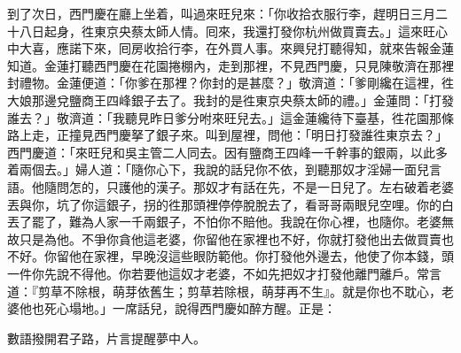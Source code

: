 到了次日，西門慶在廳上坐着，叫過來旺兒來：「你收拾衣服行李，趕明日三月二十八日起身，徃東京央蔡太師人情。囘來，我還打發你杭州做買賣去。」這來旺心中大喜，{}應諾下來，囘房收拾行李，在外買人事。來興兒打聽得知，就來告報金蓮知道。金蓮打聽西門慶在花園捲棚內，走到那裡，不見西門慶，只見陳敬濟在那裡封禮物。金蓮便道：「你爹在那裡？你封的是甚麼？」敬濟道：「爹剛纔在這裡，徃大娘那邊兌鹽商王四峰銀子去了。我封的是徃東京央蔡太師的禮。」金蓮問：「打發誰去？」敬濟道：「我聽見昨日爹分咐來旺兒去。」這金蓮纔待下臺基，徃花園那條路上走，正撞見西門慶拏了銀子來。叫到屋裡，問他：「明日打發誰徃東京去？」西門慶道：「來旺兒和吳主管二人同去。因有鹽商王四峰一千幹事的銀兩，以此多着兩個去。」婦人道：「隨你心下，我說的話兒你不依，到聽那奴才淫婦一面兒言語。他隨問怎的，只護他的漢子。那奴才有話在先，不是一日兒了。左右破着老婆丟與你，坑了你這銀子，拐的徃那頭裡停停脫脫去了，看哥哥兩眼兒空哩。你的白丟了罷了，難為人家一千兩銀子，不怕你不賠他。{}我說在你心裡，也隨你。老婆無故只是為他。不爭你貪他這老婆，你留他在家裡也不好，你就打發他出去做買賣也不好。你留他在家裡，早晚沒這些眼防範他。你打發他外邊去，他使了你本錢，頭一件你先說不得他。你若要他這奴才老婆，不如先把奴才打發他離門離戶。常言道：『剪草不除根，萌芽依舊生；剪草若除根，萌芽再不生』。就是你也不耽心，老婆他也死心塌地。」{}一席話兒，說得西門慶如醉方醒。正是：

\begin{myquote}
數語撥開君子路，片言提醒夢中人。
\end{myquote}

